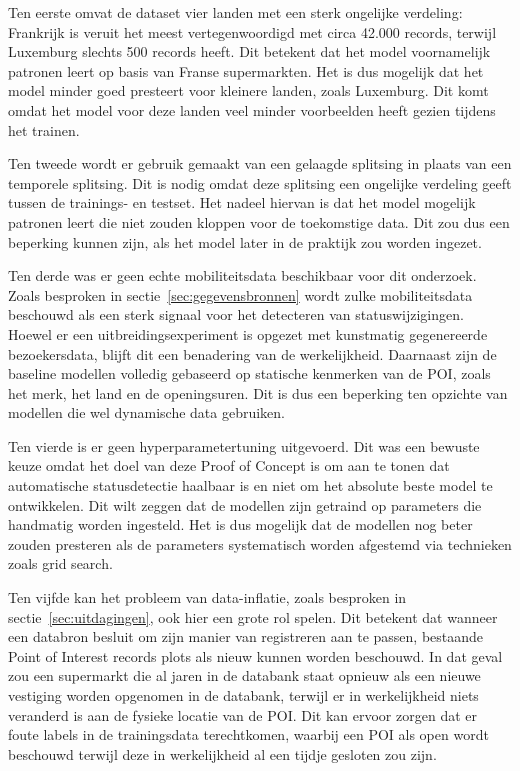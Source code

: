 Ten eerste omvat de dataset vier landen met een sterk ongelijke verdeling: Frankrijk is veruit het meest vertegenwoordigd met circa 42.000 records, terwijl Luxemburg slechts 500 records heeft. Dit betekent dat het model voornamelijk patronen leert op basis van Franse supermarkten. Het is dus mogelijk dat het model minder goed presteert voor kleinere landen, zoals Luxemburg. Dit komt omdat het model voor deze landen veel minder voorbeelden heeft gezien tijdens het trainen.

Ten tweede wordt er gebruik gemaakt van een gelaagde splitsing in plaats van een temporele splitsing. Dit is nodig omdat deze splitsing een ongelijke verdeling geeft tussen de trainings- en testset. Het nadeel hiervan is dat het model mogelijk patronen leert die niet zouden kloppen voor de toekomstige data. Dit zou dus een beperking kunnen zijn, als het model later in de praktijk zou worden ingezet.

Ten derde was er geen echte mobiliteitsdata beschikbaar voor dit onderzoek. Zoals besproken in sectie~\ref{sec:gegevensbronnen} wordt zulke mobiliteitsdata beschouwd als een sterk signaal voor het detecteren van statuswijzigingen. Hoewel er een uitbreidingsexperiment is opgezet met kunstmatig gegenereerde bezoekersdata, blijft dit een benadering van de werkelijkheid. Daarnaast zijn de baseline modellen volledig gebaseerd op statische kenmerken van de POI, zoals het merk, het land en de openingsuren. Dit is dus een beperking ten opzichte van modellen die wel dynamische data gebruiken.

Ten vierde is er geen hyperparametertuning uitgevoerd. Dit was een bewuste keuze omdat het doel van deze Proof of Concept is om aan te tonen dat automatische statusdetectie haalbaar is en niet om het absolute beste model te ontwikkelen. Dit wilt zeggen dat de modellen zijn getraind op parameters die handmatig worden ingesteld. Het is dus mogelijk dat de modellen nog beter zouden presteren als de parameters systematisch worden afgestemd via technieken zoals grid search.

Ten vijfde kan het probleem van data-inflatie, zoals besproken in sectie~\ref{sec:uitdagingen}, ook hier een grote rol spelen. Dit betekent dat wanneer een databron besluit om zijn manier van registreren aan te passen, bestaande Point of Interest records plots als nieuw kunnen worden beschouwd. In dat geval zou een supermarkt die al jaren in de databank staat opnieuw als een nieuwe vestiging worden opgenomen in de databank, terwijl er in werkelijkheid niets veranderd is aan de fysieke locatie van de POI. Dit kan ervoor zorgen dat er foute labels in de trainingsdata terechtkomen, waarbij een POI als open wordt beschouwd terwijl deze in werkelijkheid al een tijdje gesloten zou zijn.


